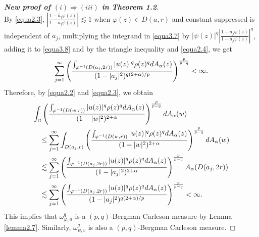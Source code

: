 \documentclass[10pt,a4paper]{amsart}
\begin{document}
\begin{proof}[{\bf New proof of $(i)\Rightarrow (iii)$ in Theorem 1.2}]
\begin{equation}
\end{equation}
By \eqref{equa2.3}, $\left|\frac{1-\overline{a}_j\varphi(z)}{1-\overline{a}_j\psi(z)}\right|\lesssim 1$ when $\varphi(z)\in D(a,r)$ and constant suppressed is independent of $a_j$, multiplying the integrand in \eqref{equa3.7} by $|\psi(z)|^q\left|\frac{1-\overline{a_j}\varphi(z)}{1-\overline{a}_j\psi(z)}\right|^q$, adding it to \eqref{equa3.8} and by the triangle inequality and \eqref{equa2.4}, we get
\begin{equation}\label{equa3.9}
\sum_{j=1}^{\infty}\left(\frac{\int_{\varphi^{-1}(D(a_j,2r))}|u(z)|^q\rho(z)^q{\rm d}A_{\alpha}(z)}{(1-|a_j|^2)^{q(2+\alpha)/p}}\right)^{\frac{p}{p-q}}<\infty.
\end{equation}
Therefore, by \eqref{equa2.2} and \eqref{equa2.3}, we obtain
\begin{equation}\label{equa3.10}
\begin{split}
&\int_{\mathbb{D}}\left(\frac{\int_{\varphi^{-1}(D(w,r))}|u(z)|^q\rho(z)^q{\rm d}A_{\alpha}(z)}{(1-|w|^2)^{2+\alpha}}\right)^{\frac{p}{p-q}}{\rm d}A_{\alpha}(w)\\
&\quad \leq \sum_{j=1}^{\infty}\int_{D(a_j,r)}\left(\frac{\int_{\varphi^{-1}(D(w,r))}|u(z)|^q\rho(z)^q{\rm d}A_{\alpha}(z)}{(1-|w|^2)^{2+\alpha}}\right)^{\frac{p}{p-q}}{\rm d}A_{\alpha}(w)\\
&\quad \lesssim \sum_{j=1}^{\infty}\left(\frac{\int_{\varphi^{-1}(D(a_j,2r))}|u(z)|^q\rho(z)^q{\rm d}A_{\alpha}(z)}{(1-|a_j|^2)^{2+\alpha}}\right)^{\frac{p}{p-q}}A_{\alpha}(D(a_j,2r))\\
&\quad \lesssim \sum_{j=1}^{\infty}\left(\frac{\int_{\varphi^{-1}(D(a_j,2r))}|u(z)|^q\rho(z)^q{\rm d}A_{\alpha}(z)}{(1-|a_j|^2)^{q(2+\alpha)/p}}\right)^{\frac{p}{p-q}}<\infty.
\end{split}
\end{equation}
This implies that $\omega_{\varphi,u}^q$ is a $(p,q)$-Bergman Carleson measure by Lemma \ref{lemma2.7}. Similarly, $\omega_{\psi,v}^q$ is also a $(p,q)$-Bergman Carleson measure.


\end{proof}
\end{document}
